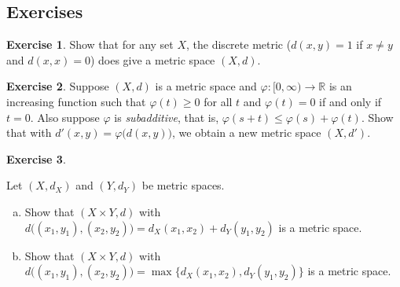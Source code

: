 \documentclass[12pt,openany]{book}
\newcommand{\R}{{\mathbb{R}}}
\newcommand{\myindex}[1]{#1\index{#1}}
\theoremstyle{plain}
\theoremstyle{remark}
\theoremstyle{definition}
\newenvironment{exbox}{%
    \def\FrameCommand{\vrule width 1pt \relax\hspace {10pt}}%
    \MakeFramed {\advance \hsize -\width \FrameRestore }%
}{%
    \endMakeFramed
}
\newenvironment{exparts}{%
    \leavevmode\begin{enumerate}[a),noitemsep,topsep=0pt,parsep=0pt,partopsep=0pt]
}{%
    \end{enumerate}
}
\theoremstyle{exercise}
\newtheorem{exercise}{Exercise}[section]
\theoremstyle{example}
\begin{document}
\subsection{Exercises}

\begin{exbox}
\begin{exercise}
Show that for any set $X$, the discrete metric ($d(x,y) = 1$ if $x\not=y$ and
$d(x,x) = 0$) does give a metric space $(X,d)$.
\end{exercise}

%


\begin{exercise}
Suppose $(X,d)$ is a metric space and
$\varphi \colon [0,\infty) \to \R$ is
an increasing function such that 
$\varphi(t) \geq 0$ for all $t$ and $\varphi(t) = 0$ if and only if
$t=0$.  Also suppose $\varphi$ is \emph{\myindex{subadditive}},
that is, $\varphi(s+t) \leq \varphi(s)+\varphi(t)$.
Show that with $d'(x,y) = \varphi\bigl(d(x,y)\bigr)$, we obtain a new
metric space $(X,d')$.
\end{exercise}

\begin{exercise} \label{exercise:mscross}
\begin{samepage}
Let $(X,d_X)$ and $(Y,d_Y)$ be metric spaces.
\begin{exparts}
\item
Show that $(X \times Y,d)$ with
$d\bigl( (x_1,y_1), (x_2,y_2) \bigr) = d_X(x_1,x_2) + d_Y(y_1,y_2)$ is
a metric space.
\item
Show that $(X \times Y,d)$ with
$d\bigl( (x_1,y_1), (x_2,y_2) \bigr) = \max \{ d_X(x_1,x_2) , d_Y(y_1,y_2) \}$ is
a metric space.
\end{exparts}
\end{samepage}
\end{exercise}


\end{exbox}
\end{document}
